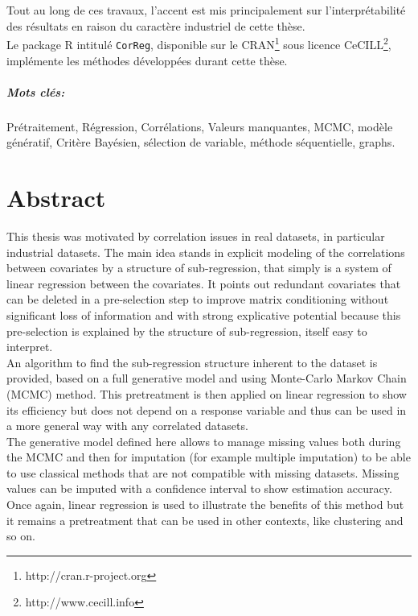\documentclass[12pt,a4paper]{report}
\begin{document}
	Tout au long de ces travaux, l'accent est mis principalement sur l'interprétabilité des résultats en raison du caractère industriel de cette thèse. 
\\	

	Le package R intitulé {\tt CorReg}, disponible sur le CRAN\footnote{http://cran.r-project.org} sous licence CeCILL\footnote{http://www.cecill.info}, implémente les méthodes développées durant cette thèse.
	
\paragraph{Mots clés:}Prétraitement, Régression, Corrélations, Valeurs manquantes, MCMC, modèle génératif, Critère Bayésien, sélection de variable, méthode séquentielle, graphs.
\chapter*{Abstract}
	This thesis was motivated by correlation issues in real datasets, in particular industrial datasets. The main idea stands in explicit modeling of the correlations between covariates by a structure of sub-regression, that simply is a system of linear regression between the covariates. It points out redundant covariates that can be deleted in a pre-selection step to improve matrix conditioning without significant loss of information and with strong explicative potential because this pre-selection is explained by the structure of sub-regression, itself easy to interpret.
	\\
	
	An algorithm to find the sub-regression structure inherent to the dataset is provided, based on a full generative model and using Monte-Carlo Markov Chain (MCMC) method. This pretreatment is then applied on linear regression to show its efficiency but does not depend on a response variable and thus can be used in a more general way with any correlated datasets.
	\\
	
	The generative model defined here allows to manage missing values both during the MCMC and then for imputation (for example multiple imputation) to be able to use classical methods that are not compatible with missing datasets. Missing values can be imputed with a confidence interval to show estimation accuracy. Once again, linear regression is used to illustrate the benefits of this method but it remains a pretreatment that can be used in other contexts, like clustering and so on.
	\\ 
	
\end{document}
